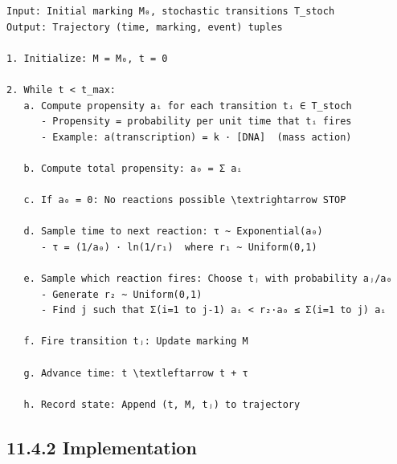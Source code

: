 \begin{lstlisting}
Input: Initial marking M₀, stochastic transitions T_stoch
Output: Trajectory (time, marking, event) tuples

1. Initialize: M = M₀, t = 0

2. While t < t_max:
   a. Compute propensity aᵢ for each transition tᵢ ∈ T_stoch
      - Propensity = probability per unit time that tᵢ fires
      - Example: a(transcription) = k · [DNA]  (mass action)
   
   b. Compute total propensity: a₀ = Σ aᵢ
   
   c. If a₀ = 0: No reactions possible \textrightarrow STOP
   
   d. Sample time to next reaction: τ ~ Exponential(a₀)
      - τ = (1/a₀) · ln(1/r₁)  where r₁ ~ Uniform(0,1)
   
   e. Sample which reaction fires: Choose tⱼ with probability aⱼ/a₀
      - Generate r₂ ~ Uniform(0,1)
      - Find j such that Σ(i=1 to j-1) aᵢ < r₂·a₀ ≤ Σ(i=1 to j) aᵢ
   
   f. Fire transition tⱼ: Update marking M
   
   g. Advance time: t \textleftarrow t + τ
   
   h. Record state: Append (t, M, tⱼ) to trajectory
\end{lstlisting}

\hypertarget{implementation}{%
\subsection{11.4.2 Implementation}\label{implementation}}

